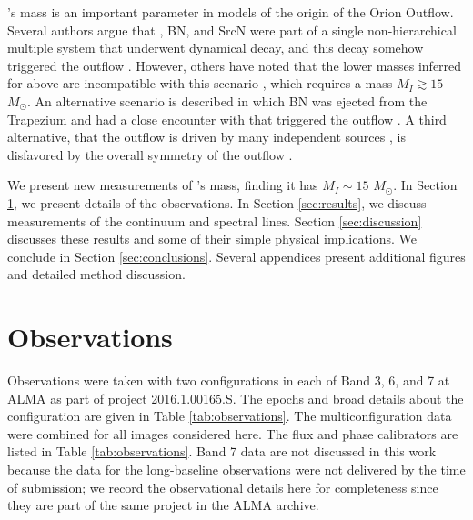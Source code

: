 \documentclass[twocolumn]{aastex61}
\newcommand{\msun}{\ensuremath{M_{\odot}}\xspace}			%
\newcommand{\sourcen}{SrcN\xspace}
\newcommand{\sourcex}{SrcX\xspace}
\begin{document}

\sourcei's mass is an important parameter in models of the origin of the Orion
Outflow.  Several authors argue that \sourcei, BN, and \sourcen \citep[or,
alternatively, \sourcex;][]{Luhman2017a} were part of a single non-hierarchical
multiple system that underwent dynamical decay, and this decay somehow
triggered the outflow
\citep{Bally2005a,Rodriguez2005a,Goddi2011b,Moeckel2012b,Bally2011a,Bally2015a,Bally2017a,Rodriguez2017a}.
However, others have noted that the lower masses inferred for \sourcei above
are incompatible with this scenario
\citep{Chatterjee2012a,Plambeck2016a,Farias2017b}, which requires a mass $M_{I}
\gtrsim 15$ \msun.  An alternative scenario is described in which BN was
ejected from the Trapezium and had a close encounter with \sourcei that
triggered the outflow \citep{Tan2008a,Tan2008b,Chatterjee2012a}.  A third
alternative, that the outflow is driven by many independent sources
\citep{Beuther2008a}, is disfavored by the overall symmetry of the outflow
\citep{Bally2017a}.

We present new measurements of \sourcei's mass, finding it has $M_I \sim 15$ \msun.
In Section \ref{sec:observations}, we present details of the observations.
In Section \ref{sec:results}, we discuss measurements of the continuum
and spectral lines.  Section \ref{sec:discussion} discusses these results and
some of their simple physical implications.
We conclude in Section \ref{sec:conclusions}.
Several appendices present additional figures and detailed method discussion.


\section{Observations}
\label{sec:observations}

Observations were taken with two configurations in each of Band 3, 6, and 7 at
ALMA as part of project 2016.1.00165.S.  The epochs and broad details about the
configuration are given in Table \ref{tab:observations}.  The
multiconfiguration data were combined for all
images considered here.
The flux and phase calibrators are listed in Table \ref{tab:observations}.
Band 7 data are not discussed in this work because the data for
the long-baseline observations were not delivered by the time of submission; we
record the observational details here for completeness since they are part of
the same project in the ALMA archive.
\end{document}
